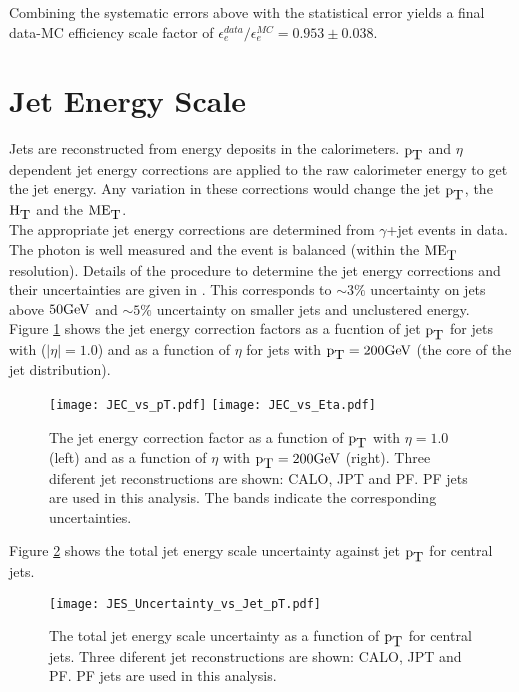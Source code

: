 {\bf }

Combining the systematic errors above with the statistical error yields a final
data-MC efficiency scale factor of $\epsilon_{e}^{data}/\epsilon_{e}^{MC} =
0.953\pm0.038$.

\section{Jet Energy Scale}

Jets are reconstructed from energy deposits in the calorimeters. $\mbox{p}_{\mbox{T}}$ and
$\eta$ dependent jet energy corrections are applied to the raw calorimeter 
energy to get the jet energy. Any variation in these corrections would change 
the jet $\mbox{p}_{\mbox{T}}$, the $\mbox{H}_{\mbox{T}}$ and the $\mbox{ME}_{\mbox{T}}$. \\

The appropriate jet energy corrections are determined from $\gamma$+jet events
in data. The photon is well measured and the event is balanced (within the
$\mbox{ME}_{\mbox{T}}$ resolution). Details of the procedure to determine the jet energy 
corrections and their uncertainties are given in \cite{jec}. This corresponds to
$\sim 3\%$ uncertainty on jets above $50\mbox{GeV}$ and $\sim 5\%$ uncertainty on 
smaller jets and unclustered energy. Figure \ref{fig:JEC_vs_pT_And_Eta} shows 
the jet energy correction factors as a fucntion of jet $\mbox{p}_{\mbox{T}}$ for jets with 
($|\eta| = 1.0$) and as a function of $\eta$ for jets with $\mbox{p}_{\mbox{T}} = 200 \mbox{GeV}$ (the
core of the jet distribution). \\

\begin{figure}
\texttt{[image: JEC\_vs\_pT.pdf]}
\texttt{[image: JEC\_vs\_Eta.pdf]}
\caption{The jet energy correction factor as a function of $\mbox{p}_{\mbox{T}}$ with $\eta =
1.0$ (left) and as a function of $\eta$ with $\mbox{p}_{\mbox{T}} = 200 \mbox{GeV}$ (right). Three
diferent jet reconstructions are shown: CALO, JPT and PF. PF jets are used in
this analysis. The bands indicate the corresponding uncertainties.}
\label{fig:JEC_vs_pT_And_Eta}
\end{figure}

Figure \ref{fig:JES_Uncertainty_vs_Jet_pT} shows the total jet energy scale 
uncertainty against jet $\mbox{p}_{\mbox{T}}$ for central jets. \\

\begin{figure}
\begin{center}
\texttt{[image: JES\_Uncertainty\_vs\_Jet\_pT.pdf]}
\end{center}
\caption{The total jet energy scale uncertainty as a function of $\mbox{p}_{\mbox{T}}$ for
central jets. Three diferent jet reconstructions are shown: CALO, JPT and PF. 
PF jets are used in this analysis.}
\label{fig:JES_Uncertainty_vs_Jet_pT}
\end{figure}

